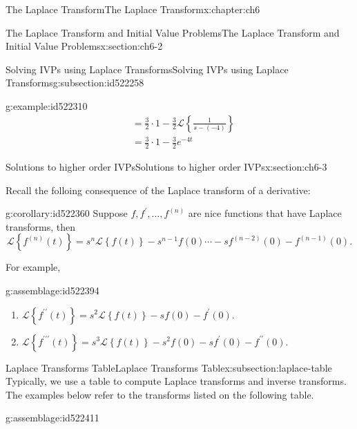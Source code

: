\documentclass[oneside,10pt,]{book}
\numberwithin{equation}{section}
\numberwithin{equation}{section}
\newcommand{\amp}{&}
\begin{document}
\begin{chapterptx}{The Laplace Transform}{}{The Laplace Transform}{}{}{x:chapter:ch6}
\begin{sectionptx}{The Laplace Transform and Initial Value Problems}{}{The Laplace Transform and Initial Value Problems}{}{}{x:section:ch6-2}
\begin{subsectionptx}{Solving IVPs using Laplace Transforms}{}{Solving IVPs using Laplace Transforms}{}{}{g:subsection:id522258}
\begin{example}{}{g:example:id522310}
\begin{align*}
\amp =\frac{3}{2}\cdot1-\frac{3}{2}\mathcal{L}\left\{ \frac{1}{s-(-4)}\right\} \\
\amp =\frac{3}{2}\cdot1-\frac{3}{2}e^{-4t}
\end{align*}
%
\end{example}
\end{subsectionptx}
\end{sectionptx}
%
%
\typeout{************************************************}
\typeout{************************************************}
%
\begin{sectionptx}{Solutions to higher order IVPs}{}{Solutions to higher order IVPs}{}{}{x:section:ch6-3}
\begin{introduction}{}%
Recall the folloing consequence of the Laplace transform of a derivative:%
\begin{corollary}{}{}{g:corollary:id522360}%
Suppose \(f,f^{\prime},\dots,f^{(n)}\) are nice functions that have Laplace transforms, then%
\begin{equation*}
\mathcal{L}\left\{ f^{(n)}(t)\right\} =s^{n}\mathcal{L}\left\{ f(t)\right\} -s^{n-1}f(0)\cdots-sf^{(n-2)}(0)-f^{(n-1)}(0).
\end{equation*}
%
\end{corollary}
 For example, \begin{assemblage}{}{g:assemblage:id522394}%
%
\begin{enumerate}
\item{}\(\mathcal{L}\left\{ f^{\prime\prime}(t)\right\} =s^{2}\mathcal{L}\left\{ f(t)\right\} -sf(0)-f^{\prime}(0)\).%
\item{}\(\mathcal{L}\left\{ f^{\prime\prime\prime}(t)\right\} =s^{3}\mathcal{L}\left\{ f(t)\right\} -s^{2}f(0)-sf^{\prime}(0)-f^{\prime\prime}(0)\).%
\end{enumerate}
%
\end{assemblage}
\end{introduction}%
%
%
\typeout{************************************************}
\typeout{************************************************}
%
\begin{subsectionptx}{Laplace Transforms Table}{}{Laplace Transforms Table}{}{}{x:subsection:laplace-table}
Typically, we use a table to compute Laplace transforms and inverse transforms. The examples below refer to the transforms listed on the following table.%
\begin{assemblage}{}{g:assemblage:id522411}%
%
\begin{equation*}

\end{equation*}
\end{assemblage}
\end{subsectionptx}
\end{sectionptx}
\end{chapterptx}
\end{document}
